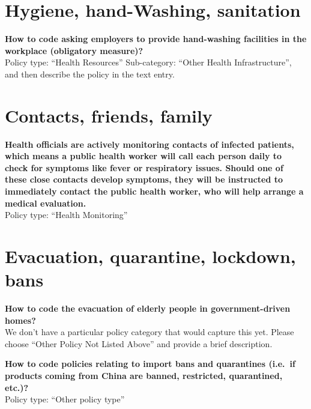 \documentclass[
]{book}
\begin{document}
\hypertarget{hygiene-hand-washing-sanitation}{%
\section{Hygiene, hand-Washing, sanitation}\label{hygiene-hand-washing-sanitation}}

\textbf{How to code asking employers to provide hand-washing facilities in the workplace (obligatory measure)?}\\
Policy type: ``Health Resources''
Sub-category: ``Other Health Infrastructure'', and then describe the policy in the text entry.

\hypertarget{contacts-friends-family}{%
\section{Contacts, friends, family}\label{contacts-friends-family}}

\textbf{Health officials are actively monitoring contacts of infected patients, which means a public health worker will call each person daily to check for symptoms like fever or respiratory issues. Should one of these close contacts develop symptoms, they will be instructed to immediately contact the public health worker, who will help arrange a medical evaluation.}\\
Policy type: ``Health Monitoring''

\hypertarget{evacuation-quarantine-lockdown-bans}{%
\section{Evacuation, quarantine, lockdown, bans}\label{evacuation-quarantine-lockdown-bans}}

\textbf{How to code the evacuation of elderly people in government-driven homes?}\\
We don't have a particular policy category that would capture this yet. Please choose ``Other Policy Not Listed Above'' and provide a brief description.

\textbf{How to code policies relating to import bans and quarantines (i.e.~if products coming from China are banned, restricted, quarantined, etc.)?}\\
Policy type: ``Other policy type''

  
\end{document}
